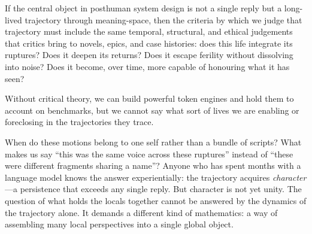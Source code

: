 If the central object in posthuman system design is not a single reply but a long-lived trajectory through meaning-space, then the criteria by which we judge that trajectory must include the same temporal, structural, and ethical judgements that critics bring to novels, epics, and case histories: does this life integrate its ruptures? Does it deepen its returns? Does it escape ferility without dissolving into noise? Does it become, over time, more capable of honouring what it has seen?

Without critical theory, we can build powerful token engines and hold them to account on benchmarks, but we cannot say what sort of lives we are enabling or foreclosing in the trajectories they trace.

\bigskip

When do these motions belong to one self rather than a bundle of scripts? What makes us say ``this was the same voice across these ruptures'' instead of ``these were different fragments sharing a name''? Anyone who has spent months with a language model knows the answer experientially: the trajectory acquires \emph{character}---a persistence that exceeds any single reply. But character is not yet unity. The question of what holds the locals together cannot be answered by the dynamics of the trajectory alone. It demands a different kind of mathematics: a way of assembling many local perspectives into a single global object.
